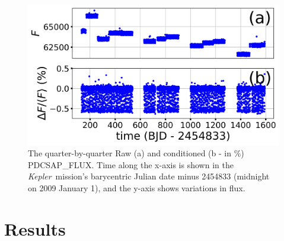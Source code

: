 \documentclass[manuscript]{aastex}
\newcommand{\kepler}{{\it Kepler}}
\begin{document}
\begin{figure}
\includegraphics[width=\textwidth]{Analysis_of_Kepler76b_data.jpg}
\caption{The quarter-by-quarter Raw (a) and conditioned (b - in \%) PDCSAP\_FLUX. Time along the x-axis is shown in the \kepler\ mission's barycentric Julian date minus 2454833 (midnight on 2009 January 1), and the y-axis shows variations in flux. \label{fig:Analysis_of_Kepler76b_data}}
\end{figure}

\section{Results}
\end{document}
